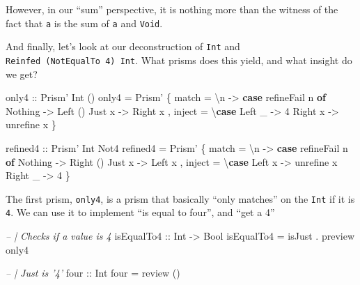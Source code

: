 \documentclass[]{article}
\newenvironment{Shaded}{}{}
\newcommand{\CommentTok}[1]{\textcolor[rgb]{0.38,0.63,0.69}{\textit{#1}}}
\newcommand{\DataTypeTok}[1]{\textcolor[rgb]{0.56,0.13,0.00}{#1}}
\newcommand{\DecValTok}[1]{\textcolor[rgb]{0.25,0.63,0.44}{#1}}
\newcommand{\FunctionTok}[1]{\textcolor[rgb]{0.02,0.16,0.49}{#1}}
\newcommand{\KeywordTok}[1]{\textcolor[rgb]{0.00,0.44,0.13}{\textbf{#1}}}
\newcommand{\NormalTok}[1]{#1}
\newcommand{\OtherTok}[1]{\textcolor[rgb]{0.00,0.44,0.13}{#1}}
\begin{document}
However, in our ``sum'' perspective, it is nothing more than the witness of the
fact that \texttt{a} is the sum of \texttt{a} and \texttt{Void}.

And finally, let's look at our deconstruction of \texttt{Int} and
\texttt{Reinfed\ (NotEqualTo\ 4)\ Int}. What prisms does this yield, and what
insight do we get?

\begin{Shaded}
\begin{Highlighting}[]
\OtherTok{only4 ::} \DataTypeTok{Prism'} \DataTypeTok{Int}\NormalTok{ ()}
\NormalTok{only4 }\FunctionTok{=} \DataTypeTok{Prism'}
\NormalTok{    \{ match  }\FunctionTok{=}\NormalTok{ \textbackslash{}n }\OtherTok{->} \KeywordTok{case}\NormalTok{ refineFail n }\KeywordTok{of}
                       \DataTypeTok{Nothing} \OtherTok{->} \DataTypeTok{Left}\NormalTok{ ()}
                       \DataTypeTok{Just}\NormalTok{ x  }\OtherTok{->} \DataTypeTok{Right}\NormalTok{ x}
\NormalTok{    , inject }\FunctionTok{=}\NormalTok{ \textbackslash{}}\KeywordTok{case} \DataTypeTok{Left}\NormalTok{  _ }\OtherTok{->} \DecValTok{4}
                     \DataTypeTok{Right}\NormalTok{ x }\OtherTok{->}\NormalTok{ unrefine x}
\NormalTok{    \}}

\OtherTok{refined4 ::} \DataTypeTok{Prism'} \DataTypeTok{Int} \DataTypeTok{Not4}
\NormalTok{refined4 }\FunctionTok{=} \DataTypeTok{Prism'}
\NormalTok{    \{ match  }\FunctionTok{=}\NormalTok{ \textbackslash{}n }\OtherTok{->} \KeywordTok{case}\NormalTok{ refineFail n }\KeywordTok{of}
                       \DataTypeTok{Nothing} \OtherTok{->} \DataTypeTok{Right}\NormalTok{ ()}
                       \DataTypeTok{Just}\NormalTok{ x  }\OtherTok{->} \DataTypeTok{Left}\NormalTok{ x}
\NormalTok{    , inject }\FunctionTok{=}\NormalTok{ \textbackslash{}}\KeywordTok{case} \DataTypeTok{Left}\NormalTok{  x }\OtherTok{->}\NormalTok{ unrefine x}
                     \DataTypeTok{Right}\NormalTok{ _ }\OtherTok{->} \DecValTok{4}
\NormalTok{    \}}
\end{Highlighting}
\end{Shaded}

The first prism, \texttt{only4}, is a prism that basically ``only matches'' on
the \texttt{Int} if it is \texttt{4}. We can use it to implement ``is equal to
four'', and ``get a 4''

\begin{Shaded}
\begin{Highlighting}[]
\CommentTok{-- | Checks if a value is 4}
\OtherTok{isEqualTo4 ::} \DataTypeTok{Int} \OtherTok{->} \DataTypeTok{Bool}
\NormalTok{isEqualTo4 }\FunctionTok{=}\NormalTok{ isJust }\FunctionTok{.}\NormalTok{ preview only4}

\CommentTok{-- | Just is '4'}
\OtherTok{four ::} \DataTypeTok{Int}
\NormalTok{four }\FunctionTok{=}\NormalTok{ review ()}
\end{Highlighting}
\end{Shaded}
\end{document}
